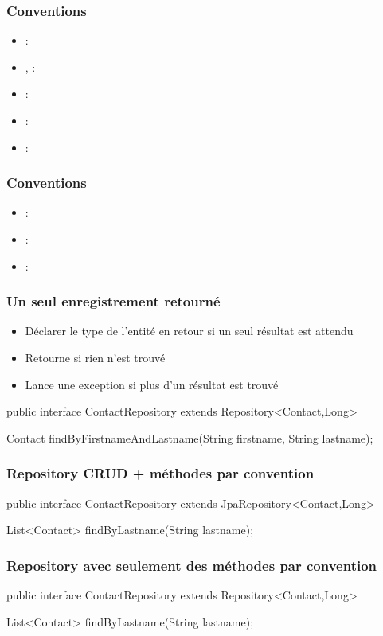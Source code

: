 \begin{frame}
 \frametitle{Conventions}
 \begin{itemize}
  \item {} : 
  \item {},  : 
  \item {} : 
  \item {} : 
  \item {} : 
 \end{itemize}
\end{frame}

\begin{frame}
 \frametitle{Conventions}
 \begin{itemize}
  \item {} : 
  \item {} : 
  \item {} : 
 \end{itemize}
\end{frame}

\begin{frame}[fragile]
 \frametitle{Un seul enregistrement retourné}
 \begin{itemize}
  \item Déclarer le type de l'entité en retour si un seul résultat est attendu
  \item Retourne  si rien n'est trouvé
  \item Lance une exception si plus d'un résultat est trouvé
 \end{itemize}
 \begin{javacode}
public interface ContactRepository extends Repository<Contact,Long> {

  Contact findByFirstnameAndLastname(String firstname, 
                                           String lastname);

}  
 \end{javacode}
\end{frame}

\begin{frame}[fragile]
 \frametitle{Repository CRUD + méthodes par convention}
 \begin{javacode}
public interface ContactRepository extends JpaRepository<Contact,Long> {

  List<Contact> findByLastname(String lastname);

}  
 \end{javacode}
\end{frame}

\begin{frame}[fragile]
 \frametitle{Repository avec seulement des méthodes par convention}
 \begin{javacode}
public interface ContactRepository extends Repository<Contact,Long> {

  List<Contact> findByLastname(String lastname);

}  
 \end{javacode}
\end{frame}